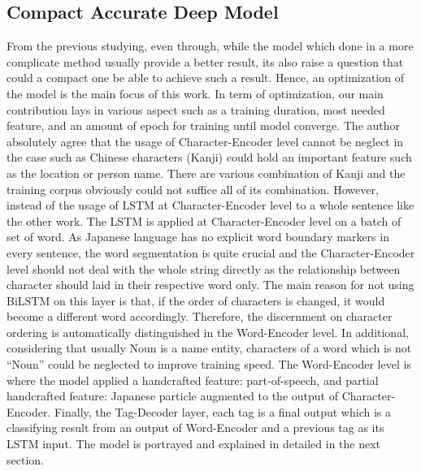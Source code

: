 \subsection{Compact Accurate Deep Model}
From the previous studying, even through, while the model which done in a more complicate method usually provide a better result, its also raise a question that could a compact one be able to achieve such a result.
Hence, an optimization of the model is the main focus of this work.
In term of optimization, our main contribution lays in various aspect such as a training duration, most needed feature, and an amount of epoch for training until model converge.
The author absolutely agree that the usage of Character-Encoder level cannot be neglect in the case such as Chinese characters (Kanji) could hold an important feature such as the location or person name.
There are various combination of Kanji and the training corpus obviously could not suffice all of its combination.
However, instead of the usage of LSTM at Character-Encoder level to a whole sentence like the other work.
The LSTM is applied at Character-Encoder level on a batch of set of word.
As Japanese language has no explicit word boundary markers in every sentence, the word segmentation is quite crucial and the Character-Encoder level should not deal with the whole string directly as the relationship between character should laid in their respective word only.
The main reason for not using BiLSTM on this layer is that, if the order of characters is changed, it would become a different word accordingly.
Therefore, the discernment on character ordering is automatically distinguished in the Word-Encoder level.
In additional, considering that usually Noun is a name entity, characters of a word which is not ``Noun'' could be neglected to improve training speed.
The Word-Encoder level is where the model applied a handcrafted feature: part-of-speech, and partial handcrafted feature: Japanese particle augmented to the output of Character-Encoder.
Finally, the Tag-Decoder layer, each tag is a final output which is a classifying result from an output of Word-Encoder and a previous tag as its LSTM input.
The model is portrayed and explained in detailed in the next section.

